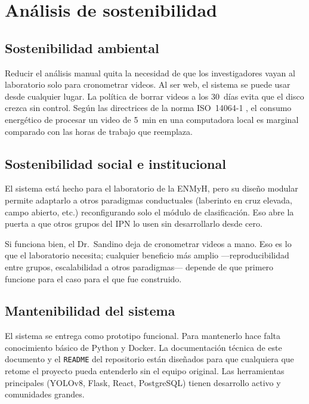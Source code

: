 \section{Análisis de sostenibilidad}

\subsection{Sostenibilidad ambiental}

Reducir el análisis manual quita la necesidad de que los investigadores vayan al
laboratorio solo para cronometrar videos. Al ser web, el sistema se puede usar desde
cualquier lugar. La política de borrar videos a los 30~días evita que el disco crezca
sin control. Según las directrices de la norma ISO~14064-1 \cite{iso14064}, el consumo
energético de procesar un video de 5~min en una computadora local es marginal comparado
con las horas de trabajo que reemplaza.

\subsection{Sostenibilidad social e institucional}

El sistema está hecho para el laboratorio de la ENMyH, pero su diseño modular permite
adaptarlo a otros paradigmas conductuales (laberinto en cruz elevada, campo abierto,
etc.) reconfigurando solo el módulo de clasificación. Eso abre la puerta a que otros
grupos del IPN lo usen sin desarrollarlo desde cero.

Si funciona bien, el Dr.\ Sandino deja de cronometrar videos a mano. Eso es lo que
el laboratorio necesita; cualquier beneficio más amplio ---reproducibilidad entre
grupos, escalabilidad a otros paradigmas--- depende de que primero funcione para
el caso para el que fue construido.

\subsection{Mantenibilidad del sistema}

El sistema se entrega como prototipo funcional. Para mantenerlo hace falta conocimiento
básico de Python y Docker. La documentación técnica de este documento y el
\texttt{README} del repositorio están diseñados para que cualquiera que retome el
proyecto pueda entenderlo sin el equipo original. Las herramientas principales (YOLOv8,
Flask, React, PostgreSQL) tienen desarrollo activo y comunidades grandes.